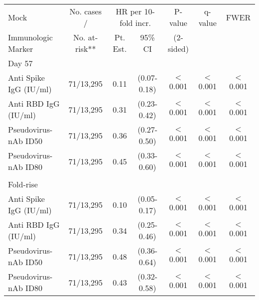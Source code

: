 \begin{tabular}{lcccccc}
   \hline
 
         \multicolumn{1}{l}{Mock} & \multicolumn{1}{c}{No. cases /}   & \multicolumn{2}{c}{HR per 10-fold incr.}                     & \multicolumn{1}{c}{P-value}   & \multicolumn{1}{c}{q-value}   & \multicolumn{1}{c}{FWER} \\ 
         \multicolumn{1}{l}{Immunologic Marker}            & \multicolumn{1}{c}{No. at-risk**} & \multicolumn{1}{c}{Pt. Est.} & \multicolumn{1}{c}{95\% CI} & \multicolumn{1}{c}{(2-sided)} & \multicolumn{1}{c}{} & \multicolumn{1}{c}{} \\ 
         \hline
 
            
 \multicolumn{5}{l}{Day 57} \\ 
Anti Spike IgG (IU/ml) & 71/13,295 & 0.11 & (0.07-0.18) & $<$0.001 & $<$0.001 & $<$0.001 \\ 
  Anti RBD IgG (IU/ml) & 71/13,295 & 0.31 & (0.23-0.42) & $<$0.001 & $<$0.001 & $<$0.001 \\ 
  Pseudovirus-nAb ID50 & 71/13,295 & 0.36 & (0.27-0.50) & $<$0.001 & $<$0.001 & $<$0.001 \\ 
  Pseudovirus-nAb ID80 & 71/13,295 & 0.45 & (0.33-0.60) & $<$0.001 & $<$0.001 & $<$0.001 \\ 
          
 \multicolumn{5}{l}{} \\ 
        
 \multicolumn{5}{l}{Fold-rise} \\ 
Anti Spike IgG (IU/ml) & 71/13,295 & 0.10 & (0.05-0.17) & $<$0.001 & $<$0.001 & $<$0.001 \\ 
  Anti RBD IgG (IU/ml) & 71/13,295 & 0.34 & (0.25-0.46) & $<$0.001 & $<$0.001 & $<$0.001 \\ 
  Pseudovirus-nAb ID50 & 71/13,295 & 0.48 & (0.36-0.64) & $<$0.001 & $<$0.001 & $<$0.001 \\ 
  Pseudovirus-nAb ID80 & 71/13,295 & 0.43 & (0.32-0.58) & $<$0.001 & $<$0.001 & $<$0.001 \\ 
   \hline
\end{tabular}
